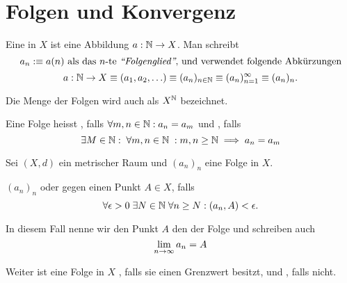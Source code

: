 \section{Folgen und Konvergenz}

\setcounter{thm}{19}
\begin{mydef}[Folge]
	Eine  in $X$ ist eine Abbildung $a: \mathbb{N} \to X$. Man schreibt
	\begin{equation}
    a_n :\equiv a(n) $ als das $n$-te \qt{Folgenglied}, und verwendet folgende Abkürzungen$
	\end{equation}
  \begin{equation}
  	a: \mathbb{N} \to X \equiv (a_1, a_2, \ldots) \equiv (a_n)_{n\in\mathbb{N}} \equiv(a_n)_{n=1}^{\infty} \equiv (a_n)_n.
  \end{equation}

	Die Menge der Folgen wird auch als $X^{\mathbb{N}}$ bezeichnet.

	Eine Folge heisst , falls $\forall m,n \in \mathbb{N}: a_n=a_m$ und , falls
	\begin{equation}
		\exists M\in \mathbb{N}: \; \forall m,n \in \mathbb{N} \; : m,n \geq \mathbb{N} \implies a_n = a_m
	\end{equation}
\end{mydef}

\begin{mydef}[Konvergenz]
	Sei $(X,d)$ ein metrischer Raum und $(a_n)_n$ eine Folge in $X$.

	$(a_n)_n$  oder  gegen einen Punkt $A\in X$, falls
	\begin{equation}
		\forall \epsilon > 0 \; \exists N \in \mathbb{N} \; \forall n \geq N: (a_n, A) < \epsilon.
	\end{equation}

	In diesem Fall nenne wir den Punkt $A$ den  der Folge und schreiben auch
	\begin{equation}
		\lim_{n \to \infty} a_n = A
	\end{equation}

	Weiter ist eine Folge in $X$ , falls sie einen Grenzwert besitzt, und , falls nicht.
\end{mydef}


